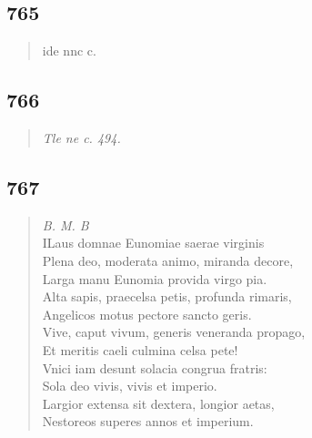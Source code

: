 \documentclass[11pt, a4paper]{report}
\begin{document}
            \subsection*{765}
      \begin{verse}
      ide nnc c. \\ 
      \end{verse}
  
            \subsection*{766}
      \begin{verse}
      \textit{Tle ne c. 494.} \\ 
      \end{verse}
  
            \subsection*{767}
      \begin{verse}
      \textit{B. M. B} \\ ILaus domnae Eunomiae saerae virginis \\ Plena deo, moderata animo, miranda decore, \\ Larga manu Eunomia provida virgo pia. \\ Alta sapis, praecelsa petis, profunda rimaris, \\ Angelicos motus pectore sancto geris. \\ Vive, caput vivum, generis veneranda propago, \\ Et meritis caeli culmina celsa pete! \\ Vnici iam desunt solacia congrua fratris: \\ Sola deo vivis, vivis et imperio. \\ Largior extensa sit dextera, longior aetas, \\ Nestoreos superes annos et imperium. \\ 
      \end{verse}
  
\end{document}
